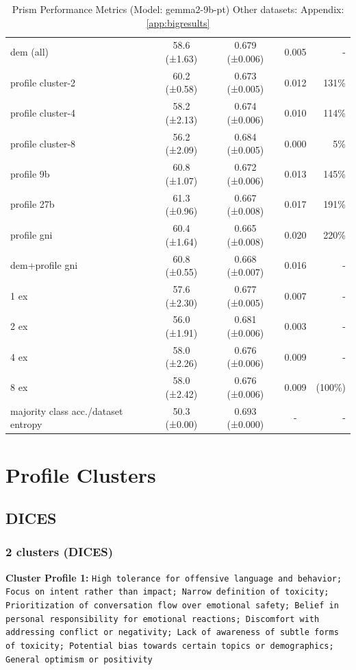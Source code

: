\documentclass[11pt]{article}
\begin{document}
\begin{table}[h]
\begin{tabular}{|l|c|c|c|r|}
dem (all) & 58.6 (±1.63) & 0.679 (±0.006) & 0.005 & - \\
profile cluster-2 & 60.2 (±0.58) & 0.673 (±0.005) & 0.012 & 131\% \\
profile cluster-4 & 58.2 (±2.13) & 0.674 (±0.006) & 0.010 & 114\% \\
profile cluster-8 & 56.2 (±2.09) & 0.684 (±0.005) & 0.000 & 5\% \\
profile 9b & 60.8 (±1.07) & 0.672 (±0.006) & 0.013 & 145\% \\
profile 27b & 61.3 (±0.96) & 0.667 (±0.008) & 0.017 & 191\% \\
profile gni & 60.4 (±1.64) & 0.665 (±0.008) & 0.020 & 220\% \\
dem+profile gni & 60.8 (±0.55) & 0.668 (±0.007) & 0.016 & - \\
1 ex & 57.6 (±2.30) & 0.677 (±0.005) & 0.007 & - \\
2 ex & 56.0 (±1.91) & 0.681 (±0.006) & 0.003 & - \\
4 ex & 58.0 (±2.26) & 0.676 (±0.006) & 0.009 & - \\
8 ex & 58.0 (±2.42) & 0.676 (±0.006) & 0.009 & (100\%) \\
majority class acc./dataset entropy & 50.3 (±0.00) & 0.693 (±0.000) & - & - \\
\hline
\end{tabular}
\caption{Prism Performance Metrics (Model: gemma2-9b-pt) Other datasets: Appendix: \ref{app:bigresults}}
\label{tab:performance_prism}
\end{table}


\newpage
\section{Profile Clusters}

\label{app:profileclusters}


\subsection{DICES}


\subsubsection{2 clusters (DICES)}


\textbf{Cluster Profile 1:} \texttt{High tolerance for offensive language and behavior; Focus on intent rather than impact; Narrow definition of toxicity; Prioritization of conversation flow over emotional safety; Belief in personal responsibility for emotional reactions; Discomfort with addressing conflict or negativity; Lack of awareness of subtle forms of toxicity; Potential bias towards certain topics or demographics; General optimism or positivity}
\end{document}
